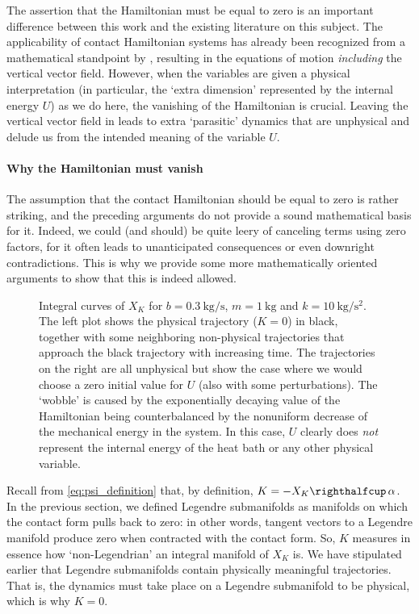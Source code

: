 The assertion that the Hamiltonian must be equal to zero is an important difference between this work and the existing literature on this subject. The applicability of contact Hamiltonian systems has already been recognized from a mathematical standpoint by \citet{Bravetti2017}, resulting in the equations of motion \emph{including} the vertical vector field. However, when the variables are given a physical interpretation (in particular, the `extra dimension' represented by the internal energy \(U\)) as we do here, the vanishing of the Hamiltonian is crucial.
Leaving the vertical vector field in leads to extra `parasitic' dynamics that are unphysical and delude us from the intended meaning of the variable \(U\).

\paragraph{Why the Hamiltonian must vanish} The assumption that the contact Hamiltonian should be equal to zero is rather striking, and the preceding arguments do not provide a sound mathematical basis for it. Indeed, we could (and should) be quite leery of canceling terms using zero factors, for it often leads to unanticipated consequences or even downright contradictions. This is why we provide some more mathematically oriented arguments to show that this is indeed allowed.

\begin{figure}[ht!]
    \centering
    
    \caption{Integral curves of \(X_K\) for \(b = \SI{0.3}{\kilogram \per \second}\), \( m = \SI{1}{\kilogram}\) and  \(k = \SI{10}{\kilogram \per \second \squared}\). The left plot shows the physical trajectory (\(K = 0\)) in black, together with some neighboring non-physical trajectories that approach the black trajectory with increasing time. The trajectories on the right are all unphysical but show the case where we would choose a zero initial value for \(U\) (also with some perturbations). The `wobble' is caused by the exponentially decaying value of the Hamiltonian being counterbalanced by the nonuniform decrease of the mechanical energy in the system. In this case, \(U\) clearly does \emph{not} represent the internal energy of the heat bath or any other physical variable.}
    \label{fig:dho_trajectories}
\end{figure}

Recall from \cref{eq:psi_definition} that, by definition, \(K = -\intpr{X_K}{\alpha}\). In the previous section, we defined Legendre submanifolds as manifolds on which the contact form pulls back to zero: in other words, tangent vectors to a Legendre manifold produce zero when contracted with the contact form. So, \(K\) measures in essence how `non-Legendrian' an integral manifold of \(X_K\) is. We have stipulated earlier that Legendre submanifolds contain physically meaningful trajectories. That is, the dynamics must take place on a Legendre submanifold to be physical, which is why \(K = 0\).

